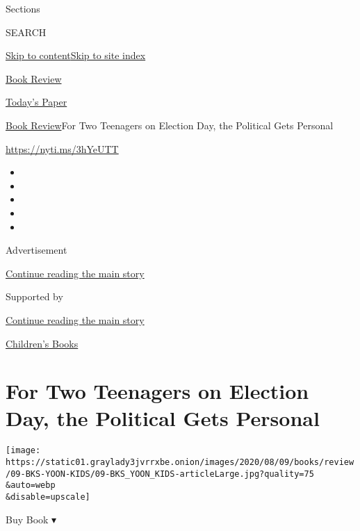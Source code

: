Sections

SEARCH

\protect\hyperlink{site-content}{Skip to
content}\protect\hyperlink{site-index}{Skip to site index}

\href{https://www.nytimes3xbfgragh.onion/section/books/review}{Book
Review}

\href{https://myaccount.nytimes3xbfgragh.onion/auth/login?response_type=cookie\&client_id=vi}{}

\href{https://www.nytimes3xbfgragh.onion/section/todayspaper}{Today's
Paper}

\href{/section/books/review}{Book Review}\textbar{}For Two Teenagers on
Election Day, the Political Gets Personal

\url{https://nyti.ms/3hYeUTT}

\begin{itemize}
\item
\item
\item
\item
\item
\end{itemize}

Advertisement

\protect\hyperlink{after-top}{Continue reading the main story}

Supported by

\protect\hyperlink{after-sponsor}{Continue reading the main story}

\href{/column/childrens-books}{Children's Books}

\hypertarget{for-two-teenagers-on-election-day-the-political-gets-personal}{%
\section{For Two Teenagers on Election Day, the Political Gets
Personal}\label{for-two-teenagers-on-election-day-the-political-gets-personal}}

\texttt{[image: https://static01.graylady3jvrrxbe.onion/images/2020/08/09/books/review/09-BKS-YOON-KIDS/09-BKS\_YOON\_KIDS-articleLarge.jpg?quality=75\\\&auto=webp\\\&disable=upscale]}

Buy Book ▾

